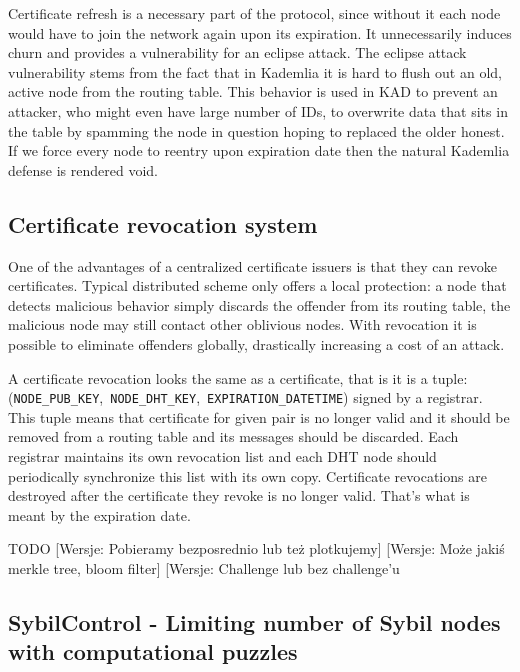 Certificate refresh is a necessary part of the protocol, since without it each
node would have to join the network again upon its expiration. It unnecessarily
induces churn and provides a vulnerability for an eclipse attack. The eclipse
attack vulnerability stems from the fact that in Kademlia it is hard to flush
out an old, active node from the routing table. This behavior is used in KAD to
prevent an attacker, who might even have large number of IDs, to overwrite data
that sits in the table by spamming the node in question hoping to replaced the
older honest. If we force every node to reentry upon expiration date then the
natural Kademlia defense is rendered void.

\subsection{Certificate revocation system}

One of the advantages of a centralized certificate issuers is that they can
revoke certificates. Typical distributed scheme only offers a local protection:
a node that detects malicious behavior simply discards the offender from its
routing table, the malicious node may still contact other oblivious nodes. With
revocation it is possible to eliminate offenders globally, drastically
increasing a cost of an attack.

A certificate revocation looks the same as a certificate, that is it is a
tuple:\\
(\texttt{NODE\_PUB\_KEY},~\texttt{NODE\_DHT\_KEY},~\texttt{EXPIRATION\_DATETIME})
signed by a registrar. This tuple means that certificate for given pair is no
longer valid and it should be removed from a routing table and its messages
should be discarded. Each registrar maintains its own revocation list and each
DHT node should periodically synchronize this list with its own copy.
Certificate revocations are destroyed after the certificate they revoke is no
longer valid. That's what is meant by the expiration date.

TODO
[Wersje: Pobieramy bezposrednio lub też plotkujemy]
[Wersje: Może jakiś merkle tree, bloom filter]
[Wersje: Challenge lub bez challenge'u

\subsection{SybilControl - Limiting number of Sybil nodes with computational
puzzles}

